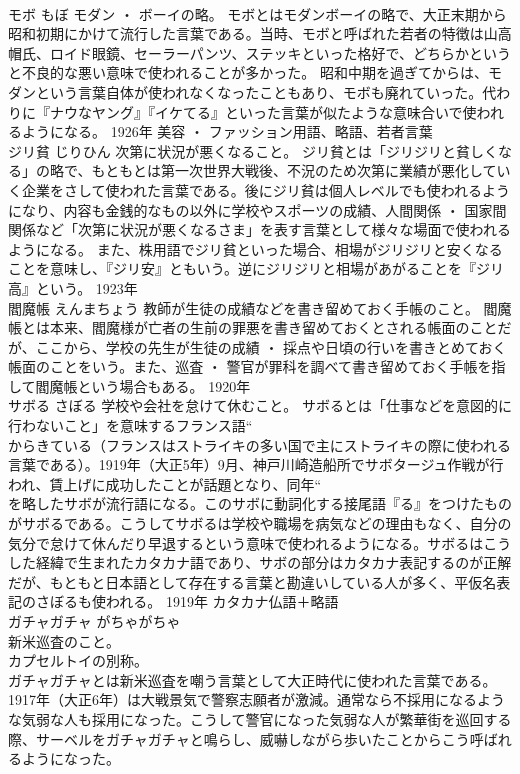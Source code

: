 \documentclass[8pt]{extreport}
\begin{document}
\begin{CJK}{UTF8}{min}
\\	モボ	もぼ	モダン ・ ボーイの略。	モボとはモダンボーイの略で、大正末期から昭和初期にかけて流行した言葉である。当時、モボと呼ばれた若者の特徴は山高帽氏、ロイド眼鏡、セーラーパンツ、ステッキといった格好で、どちらかというと不良的な悪い意味で使われることが多かった。 昭和中期を過ぎてからは、モダンという言葉自体が使われなくなったこともあり、モボも廃れていった。代わりに『ナウなヤング』『イケてる』といった言葉が似たような意味合いで使われるようになる。	1926年	美容 ・ ファッション用語、略語、若者言葉	
\\	ジリ貧	じりひん	次第に状況が悪くなること。	ジリ貧とは「ジリジリと貧しくなる」の略で、もともとは第一次世界大戦後、不況のため次第に業績が悪化していく企業をさして使われた言葉である。後にジリ貧は個人レベルでも使われるようになり、内容も金銭的なもの以外に学校やスポーツの成績、人間関係 ・ 国家間関係など「次第に状況が悪くなるさま」を表す言葉として様々な場面で使われるようになる。 また、株用語でジリ貧といった場合、相場がジリジリと安くなることを意味し、『ジリ安』ともいう。逆にジリジリと相場があがることを『ジリ高』という。	1923年	
\\	閻魔帳	えんまちょう	教師が生徒の成績などを書き留めておく手帳のこと。	閻魔帳とは本来、閻魔様が亡者の生前の罪悪を書き留めておくとされる帳面のことだが、ここから、学校の先生が生徒の成績 ・ 採点や日頃の行いを書きとめておく帳面のことをいう。また、巡査 ・ 警官が罪科を調べて書き留めておく手帳を指して閻魔帳という場合もある。	1920年	
\\	サボる	さぼる	学校や会社を怠けて休むこと。	サボるとは「仕事などを意図的に行わないこと」を意味するフランス語“
\\	からきている（フランスはストライキの多い国で主にストライキの際に使われる言葉である）。1919年（大正5年）9月、神戸川崎造船所でサボタージュ作戦が行われ、賃上げに成功したことが話題となり、同年“
\\	を略したサボが流行語になる。このサボに動詞化する接尾語『る』をつけたものがサボるである。こうしてサボるは学校や職場を病気などの理由もなく、自分の気分で怠けて休んだり早退するという意味で使われるようになる。サボるはこうした経緯で生まれたカタカナ語であり、サボの部分はカタカナ表記するのが正解だが、もともと日本語として存在する言葉と勘違いしている人が多く、平仮名表記のさぼるも使われる。	1919年	カタカナ仏語＋略語	
\\	ガチャガチャ	がちゃがちゃ	
\\	新米巡査のこと。 
\\	カプセルトイの別称。	
\\	ガチャガチャとは新米巡査を嘲う言葉として大正時代に使われた言葉である。1917年（大正6年）は大戦景気で警察志願者が激減。通常なら不採用になるような気弱な人も採用になった。こうして警官になった気弱な人が繁華街を巡回する際、サーベルをガチャガチャと鳴らし、威嚇しながら歩いたことからこう呼ばれるようになった。 

\end{CJK}
\end{document}
